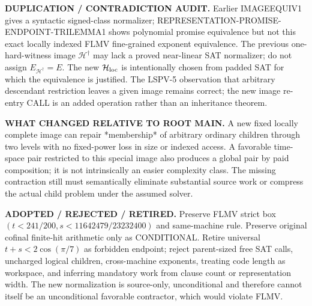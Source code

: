 \documentclass[11pt]{article}
\begin{document}
\textbf{DUPLICATION / CONTRADICTION AUDIT.} Earlier IMAGEEQUIV1 gives a syntactic signed-class normalizer; REPRESENTATION-PROMISE-ENDPOINT-TRILEMMA1 shows polynomial promise equivalence but not this exact locally indexed FLMV fine-grained exponent equivalence. The previous one-hard-witness image $\mathcal H^\dagger$ may lack a proved near-linear SAT normalizer; do not assign $E_{\mathcal H^\dagger}=E$. The new $\mathcal H_{\rm loc}$ is intentionally chosen from padded SAT for which the equivalence is justified. The LSPV-5 observation that arbitrary descendant restriction leaves a given image remains correct; the new image re-entry CALL is an added operation rather than an inheritance theorem.

\textbf{WHAT CHANGED RELATIVE TO ROOT MAIN.} A new fixed locally complete image can repair *membership* of arbitrary ordinary children through two levels with no fixed-power loss in size or indexed access. A favorable time-space pair restricted to this special image also produces a global pair by paid composition; it is not intrinsically an easier complexity class. The missing contraction still must semantically eliminate substantial source work or compress the actual child problem under the assumed solver.

\textbf{ADOPTED / REJECTED / RETIRED.} Preserve FLMV strict box $(t<241/200,s<11642479/23232400)$ and same-machine rule. Preserve original cofinal finite-hit arithmetic only as CONDITIONAL. Retire universal $t+s<2\cos(\pi/7)$ as forbidden endpoint; reject parent-sized free SAT calls, uncharged logical children, cross-machine exponents, treating code length as workspace, and inferring mandatory work from clause count or representation width. The new normalization is source-only, unconditional and therefore cannot itself be an unconditional favorable contractor, which would violate FLMV.
\end{document}
